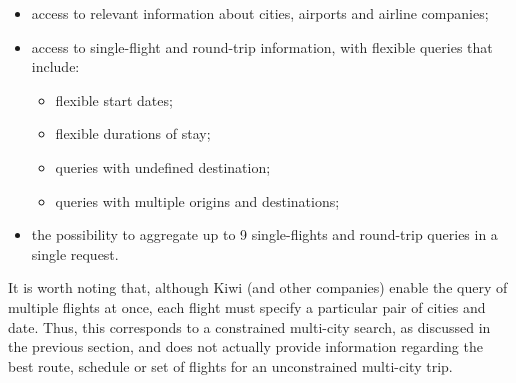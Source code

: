 \begin{itemize}
    \item access to relevant information about cities, airports and airline companies;
    \item access to single-flight and round-trip information, with flexible queries that include:
        \begin{itemize}
            \item flexible start dates;
            \item flexible durations of stay;
            \item queries with undefined destination;
            \item queries with multiple origins and destinations;
        \end{itemize}
  \item the possibility to aggregate up to 9 single-flights and round-trip queries in a single request.
\end{itemize}

It is worth noting that, although Kiwi (and other companies) enable the query of multiple flights at once, each flight must specify a particular pair of cities and date. Thus, this corresponds to a constrained multi-city search, as discussed in the previous section, and does not actually provide information regarding the best route, schedule or set of flights for an unconstrained multi-city trip.  
